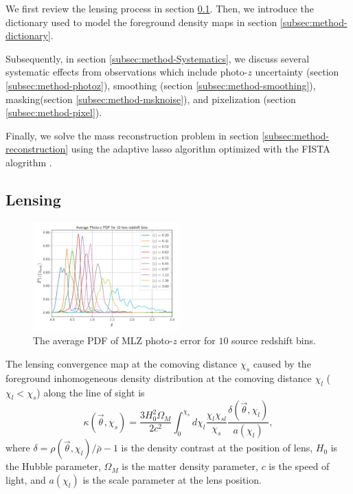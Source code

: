 \documentclass[twocolumn]{aastex62}
\begin{document}
We first review the lensing process in section \ref{subsec:method-delta2shear}.
Then, we introduce the dictionary used to model the foreground density maps in section \ref{subsec:method-dictionary}.

Subsequently, in section \ref{subsec:method-Systematics}, we discuss several systematic effects from observations which
include photo-$z$ uncertainty (section \ref{subsec:method-photoz}),
smoothing (section \ref{subsec:method-smoothing}),
masking(section \ref{subsec:method-msknoise}),
and pixelization (section \ref{subsec:method-pixel}).

Finally, we solve the mass reconstruction problem in section \ref{subsec:method-reconstruction} using the adaptive lasso
algorithm \citep{AdaLASSO-Zou2006} optimized with the FISTA alogrithm \citep{FISTA-Beck2009}.


\subsection{Lensing}
\label{subsec:method-delta2shear}

\begin{figure}[!t]
 \centering
 \includegraphics[width=0.5\textwidth]{mlz-poz.pdf}
 \caption{The average PDF of MLZ photo-$z$ error for $10$ source redshift bins.}\label{fig-pdfpz}
\end{figure}

The lensing convergence map at the comoving distance $\chi_s$ caused by the foreground inhomogeneous
density distribution at the comoving distance $\chi_l$ ($\chi_l< \chi_s$) along the line of sight is
\begin{equation}
\kappa(\vec{\theta},\chi_s)=\frac{3H_0^2\Omega_M}{2 c^2} \int_0^{\chi_s} d\chi_l \frac{\chi_l \chi_{sl}}{\chi_s}
\frac{\delta(\vec{\theta},\chi_l)}{a(\chi_l)},
\end{equation}
where $\delta=\rho(\vec{\theta},\chi_l)/\bar{\rho}-1$ is the density contrast
at the position of lens, $H_0$ is the Hubble parameter, $\Omega_M$ is the matter density parameter, $c$ is the speed
of light, and $a(\chi_l)$ is the scale parameter at the lens position.
\end{document}
